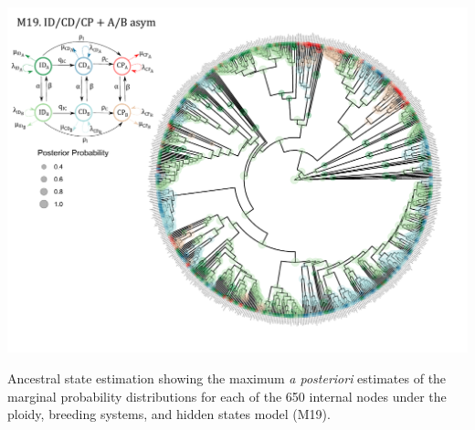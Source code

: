 \begin{suppfigure}
\includegraphics[width=\textwidth]{figS14.pdf}
\caption{Ancestral state estimation showing the maximum \emph{a posteriori} estimates of the marginal probability distributions for each of the 650 internal nodes under the  ploidy, breeding systems, and hidden states model (M19).} %
\label{suppfigure:IDCDCPnodipABasr}
\end{suppfigure}



